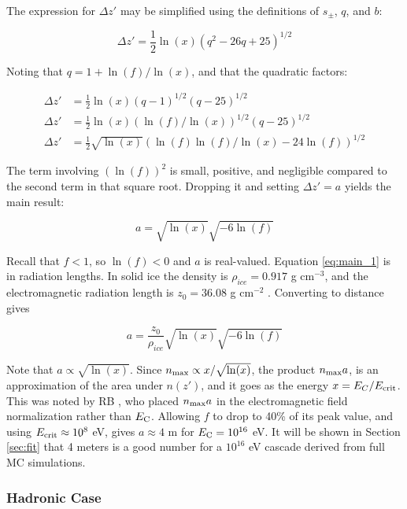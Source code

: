 \documentclass[amsmath,amssymb,aps,prd,10pt,twocolumn]{revtex4}
\begin{document}
The expression for $\Delta z'$ may be simplified using the definitions of $s_{\pm}$, $q$, and $b$:

\begin{equation}
\Delta z' = \frac{1}{2} \ln(x) (q^2 -26 q +25)^{1/2}
\end{equation}

Noting that $q = 1 + \ln(f)/\ln(x)$, and that the quadratic factors:

\begin{align}
\Delta z' &= \frac{1}{2} \ln(x) (q-1)^{1/2}(q-25)^{1/2} \\
\Delta z' &= \frac{1}{2} \ln(x) (\ln(f)/\ln(x))^{1/2}(q-25)^{1/2} \\
\Delta z' &= \frac{1}{2}\sqrt{\ln(x)} \left( \ln(f) \ln(f) / \ln(x) - 24 \ln(f) \right)^{1/2}
\end{align}

The term involving $(\ln(f))^2$ is small, positive, and negligible compared to the second term in that square root.  Dropping it and setting $\Delta z' = a$ yields the main result:

\begin{equation}
\boxed{
a = \sqrt{\ln(x)} \sqrt{-6\ln(f)}
} \label{eq:main_1}
\end{equation}

Recall that $f<1$, so $\ln(f)<0$ and $a$ is real-valued.  Equation \ref{eq:main_1} is in radiation lengths.  In solid ice the density is $\rho_{ice} = 0.917$ g cm$^{-3}$, and the electromagnetic radiation length is $z_0 = 36.08$ g cm$^{-2}$ \cite{10.1016/j.astropartphys.2017.03.008}.  Converting to distance gives 

\begin{equation}
\boxed{
a = \frac{z_0}{\rho_{ice}}\sqrt{\ln(x)}\sqrt{-6 \ln(f)}
}
\end{equation}

Note that $a \propto \sqrt{\ln(x)}$.  Since $n_{\rm max} \propto x/\sqrt{\ln(x)}$, the product $n_{\rm max} a$, is an approximation of the area under $n(z')$, and it goes as the energy $x = E_C/E_{\rm crit}$.  This was noted by RB \cite{10.1103/physrevd.65.016003}, who placed $n_{\rm max} a$ in the electromagnetic field normalization rather than $E_{\rm C}$.  Allowing $f$ to drop to 40\% of its peak value, and using $E_{\rm crit} \approx 10^8$ eV, gives $a \approx 4$ m for $E_{\rm C} = 10^{16}$ eV.  It will be shown in Section \ref{sec:fit} that 4 meters is a good number for a $10^{16}$ eV cascade derived from full MC simulations.

\subsubsection{Hadronic Case}
\end{document}
